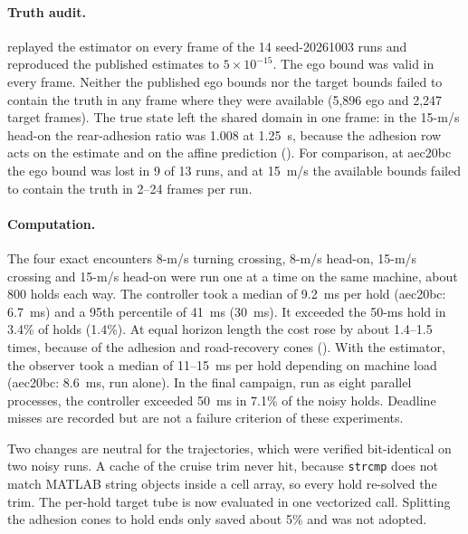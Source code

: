 \documentclass[11pt]{article}
\begin{document}
\paragraph{Truth audit.}  replayed the
estimator on every frame of the 14 seed-20261003 runs and reproduced the
published estimates to $5\times10^{-15}$. The ego bound was valid in every
frame. Neither the published ego bounds nor the target bounds failed to
contain the truth in any frame where they were available (5,896 ego and 2,247
target frames).
The true state left the shared domain in one frame: in the 15-m/s
head-on the rear-adhesion ratio was 1.008 at 1.25~s, because the adhesion
row acts on the estimate and on the affine prediction
(). For comparison, at aec20bc the ego
bound was lost in 9 of 13 runs, and at 15~m/s the available bounds failed to
contain the truth in 2--24 frames per run.

\paragraph{Computation.} The four exact encounters 8-m/s turning crossing,
8-m/s head-on, 15-m/s crossing and 15-m/s head-on were run one at a time on the
same machine, about 800 holds each way. The controller took a median of
9.2~ms per hold (aec20bc: 6.7~ms) and a 95th percentile of 41~ms (30~ms). It
exceeded the 50-ms hold in 3.4\% of holds (1.4\%). At equal horizon length the
cost rose by about 1.4--1.5 times, because of the adhesion and road-recovery
cones (). With the
estimator, the observer took a median of 11--15~ms per hold depending on
machine load (aec20bc: 8.6~ms, run alone). In the final campaign, run as eight
parallel processes, the controller exceeded 50~ms in 7.1\% of the noisy
holds. Deadline misses are recorded but are not a failure criterion of these
experiments.

Two changes are neutral for the trajectories, which were verified
bit-identical on two noisy runs. A cache of the cruise trim never hit,
because \texttt{strcmp} does not match MATLAB string objects inside a cell
array, so every hold re-solved the trim. The per-hold target tube is now
evaluated in one vectorized call. Splitting the adhesion cones to hold ends
only saved about 5\% and was not adopted.
\end{document}
